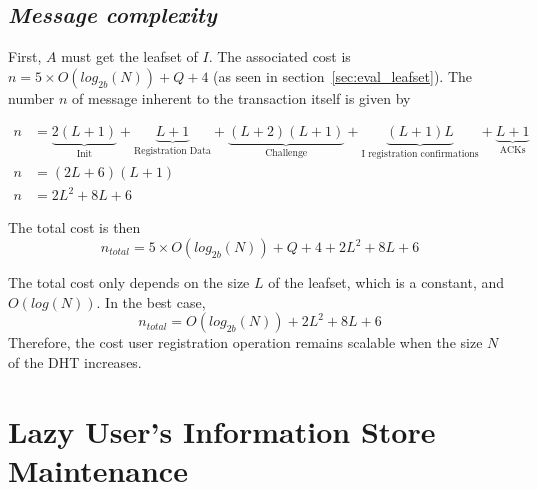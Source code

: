     
  \subsection{\textit{Message complexity}}
    First, $A$ must get the leafset of $I$. The associated cost is $n = 5
\times O(log_{2b}(N)) + Q + 4$ (as seen in section~\ref{sec:eval_leafset}).
    The number $n$ of message inherent to the transaction itself is given by

    \begin{align}
      n &= \underbrace{2(L+1)}_\text{Init} +
           \underbrace{L+1}_\text{Registration Data} +
           \underbrace{(L+2)(L+1)}_\text{Challenge} +
           \underbrace{(L+1)L}_\text{I registration confirmations} +
           \underbrace{L+1}_\text{ACKs}\\
      n &= (2L+6)(L+1)\\
      n &= 2L^2+ 8L + 6
    \end{align}

     The total cost is then
    $$
      n_{total} = 5 \times O(log_{2b}(N)) + Q + 4 + 2L^2 + 8L + 6
    $$    

    The total cost only depends on the size $L$ of the leafset, which is a
constant, and $O(log(N))$. In the best case, 
    $$
      n_{total} = O(log_{2b}(N)) + 2L^2 + 8L + 6
    $$
    Therefore, the cost user registration operation remains scalable when the size $N$ of the DHT increases.

\section{Lazy User's Information Store Maintenance}
\label{sec:eval_lazy_maintenance}


